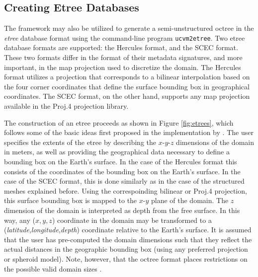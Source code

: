 


\subsection{Creating Etree Databases}

The framework may also be utilized to generate a semi-unstructured octree in the \textit{etree} database format \citep{Tu_2003_Tech} using the command-line program \texttt{ucvm2etree}. Two etree database formats are supported: the Hercules format, and the SCEC format. These two formats differ in the format of their metadata signatures, and more important, in the map projection used to discretize the domain. The Hercules format utilizes a projection that corresponds to a bilinear interpolation based on the four corner coordinates that define the surface bounding box in geographical coordinates. The SCEC format, on the other hand, supports any map projection available in the Proj.4 projection library.

The construction of an etree proceeds as shown in Figure \ref{fig:etrees}, which follows some of the basic ideas first proposed in the implementation by \citet{Taborda_2007_Proc}. The user specifies the extents of the etree by describing the $x$-$y$-$z$ dimensions of the domain in meters, as well as providing the geographical data necessary to define a bounding box on the Earth's surface. In the case of the Hercules format this consists of the coordinates of the bounding box on the Earth's surface. In the case of the SCEC format, this is done similarly as in the case of the structured meshes explained before. Using the correspoinding bilinear or Proj.4 projection, this surface bounding box is mapped to the $x$-$y$ plane of the domain. The $z$ dimension of the domain is interpreted as depth from the free surface. In this way, any ($x,y,z$) coordinate in the domain may be transformed to a (\textit{latitude},\textit{longitude},\textit{depth}) coordinate relative to the Earth's surface. It is assumed that the user has pre-computed the domain dimensions such that they reflect the actual distances in the geographic bounding box (using any preferred projection or spheroid model). Note, however, that the octree format places restrictions on the possible valid domain sizes \citep{Tu_2003_Tech, Taborda_2007_Proc}.




